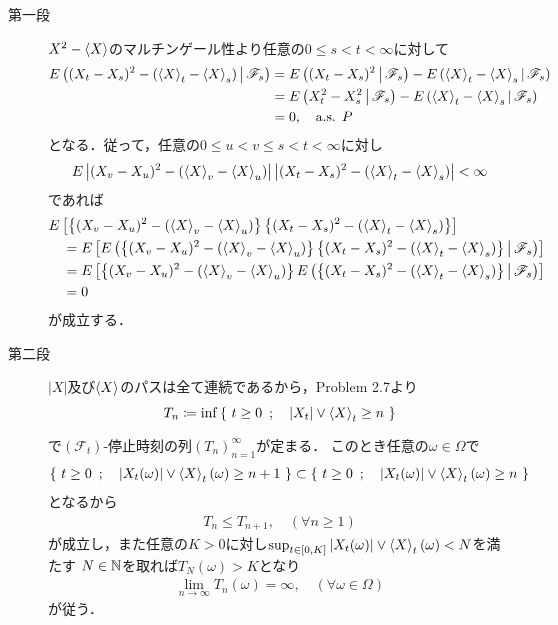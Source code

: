 	\begin{prf}\mbox{}
		\begin{description}
			\item[第一段]
				$X^2 - \inprod<X>$のマルチンゲール性より任意の$0 \leq s < t < \infty$に対して
				\begin{align}
					\cexp{(X_t - X_s)^2 - (\inprod<X>_t - \inprod<X>_s)}{\mathscr{F}_s}
					&= \cexp{(X_t - X_s)^2}{\mathscr{F}_s} - \cexp{\inprod<X>_t - \inprod<X>_s}{\mathscr{F}_s} \\
					&= \cexp{X_t^2 - X_s^2}{\mathscr{F}_s} - \cexp{\inprod<X>_t - \inprod<X>_s}{\mathscr{F}_s} \\
					&= 0,
					\quad \mbox{a.s. $P$}
				\end{align}
				となる．従って，任意の$0 \leq u < v \leq s < t < \infty$に対し
				\begin{align}
					E\left|(X_v - X_u)^2 - (\inprod<X>_v - \inprod<X>_u)\right|
					\left|(X_t - X_s)^2 - (\inprod<X>_t - \inprod<X>_s)\right| < \infty
				\end{align}
				であれば
				\begin{align}
					&E \left[\left\{(X_v - X_u)^2 - (\inprod<X>_v - \inprod<X>_u)\right\}
						\left\{(X_t - X_s)^2 - (\inprod<X>_t - \inprod<X>_s)\right\}\right] \\
					&\quad= E \left[\cexp{\left\{(X_v - X_u)^2 - (\inprod<X>_v - \inprod<X>_u)\right\}
						\left\{(X_t - X_s)^2 - (\inprod<X>_t - \inprod<X>_s)\right\}}{\mathscr{F}_s} \right] \\
					&\quad= E \left[\left\{(X_v - X_u)^2 - (\inprod<X>_v - \inprod<X>_u)\right\}
						\cexp{\left\{(X_t - X_s)^2 - (\inprod<X>_t - \inprod<X>_s)\right\}}{\mathscr{F}_s} \right] \\
					&\quad= 0
				\end{align}
				が成立する．
				
			\item[第二段]
				$|X|$及び$\inprod<X>$のパスは全て連続であるから，Problem 2.7より
				\begin{align}
					T_n \coloneqq \inf{}{\Set{t \geq 0}{|X_t| \vee \inprod<X>_t \geq n}}
				\end{align}
				で$(\mathscr{F}_t)$-停止時刻の列$(T_n)_{n=1}^\infty$が定まる．
				このとき任意の$\omega \in \Omega$で
				\begin{align}
					\Set{t \geq 0}{|X_t(\omega)| \vee \inprod<X>_t(\omega) \geq n+1}
					\subset \Set{t \geq 0}{|X_t(\omega)| \vee \inprod<X>_t(\omega) \geq n}
				\end{align}
				となるから
				\begin{align}
					T_n \leq T_{n+1}, \quad (\forall n \geq 1)
				\end{align}
				が成立し，また任意の$K > 0$に対し$\sup{t \in [0,K]}{|X_t(\omega)| \vee \inprod<X>_t(\omega)} < N$を満たす
				$N \in \mathbb{N}$を取れば$T_N(\omega) > K$となり
				\begin{align}
					\lim_{n \to \infty} T_n(\omega) = \infty, \quad (\forall \omega \in \Omega)
					\label{eq:chapter_1_theorem_5_8_1}
				\end{align}
				が従う．
				

\end{description}
\end{prf}
